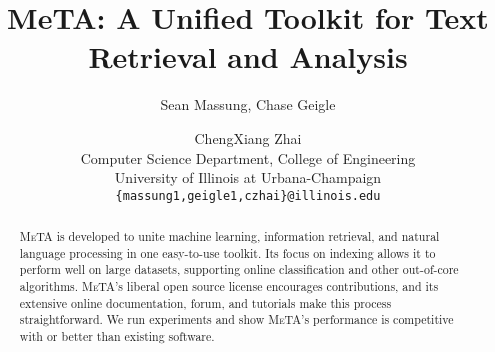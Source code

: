 \documentclass[11pt]{article}
\title{MeTA: A Unified Toolkit for Text Retrieval and Analysis}
\author{Sean Massung, Chase Geigle \and ChengXiang Zhai \\
            Computer Science Department, College of Engineering \\
            University of Illinois at Urbana-Champaign \\
            {\tt \{massung1,geigle1,czhai\}@illinois.edu}
}
\date{}
\def\meta/{\textsc{MeTA}}
\begin{document}
\maketitle

\begin{abstract}
\meta/ is developed to unite machine learning, information retrieval, and
natural language processing in one easy-to-use toolkit. Its focus on
indexing allows it to perform well on large datasets, supporting online
classification and other out-of-core algorithms. \meta/'s liberal open
source license encourages contributions, and its extensive online
documentation, forum, and tutorials make this process straightforward. We
run experiments and show \meta/'s performance is competitive with or better
than existing software.
\end{abstract}








\end{document}
